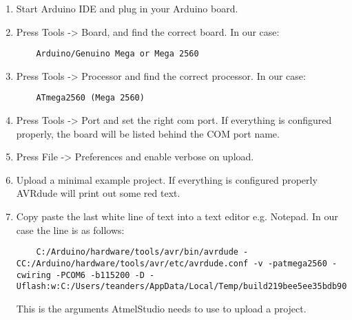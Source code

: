 \begin{enumerate}
    \item Start Arduino IDE and plug in your Arduino board.
    \item Press Tools -> Board, and find the correct board. In our case:
    \begin{lstlisting}
    Arduino/Genuino Mega or Mega 2560
    \end{lstlisting}
    \item Press Tools -> Processor and find the correct processor. In our case:
    \begin{lstlisting}
    ATmega2560 (Mega 2560)
    \end{lstlisting}
    \item Press Tools -> Port and set the right com port. If everything is configured properly, the board will be listed behind the COM port name.
    \item Press File -> Preferences and enable verbose on upload.
    \item Upload a minimal example project. If everything is configured properly AVRdude will print out some red text.
    \item Copy paste the last white line of text into a text editor e.g. Notepad. In our case the line is as follows:
    \begin{lstlisting}
    C:/Arduino/hardware/tools/avr/bin/avrdude -CC:/Arduino/hardware/tools/avr/etc/avrdude.conf -v -patmega2560 -cwiring -PCOM6 -b115200 -D -Uflash:w:C:/Users/teanders/AppData/Local/Temp/build219bee5ee35bdb906c90832b67c0fe23.tmp/teste.ino.hex:i
    \end{lstlisting}
    This is the arguments AtmelStudio needs to use to upload a project.
\end{enumerate}
\newpage

